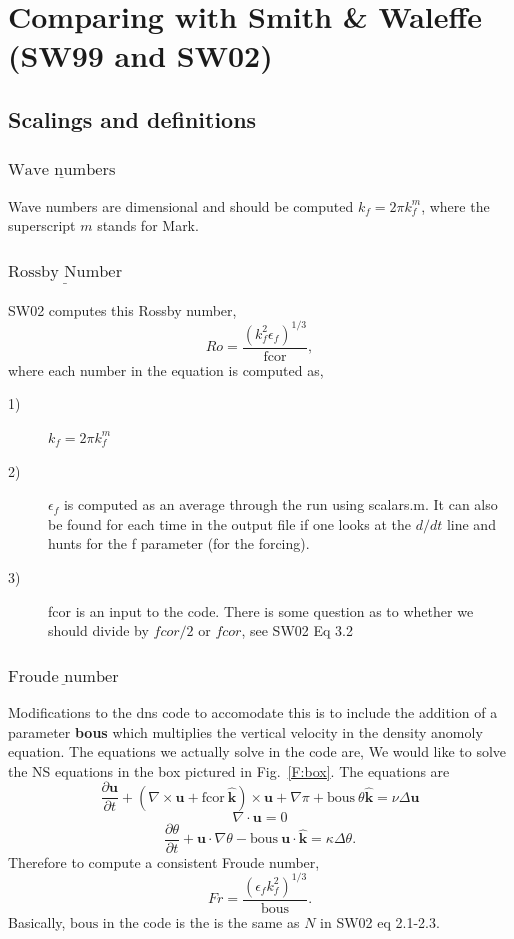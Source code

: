 \documentclass[12pt]{article}
\newcommand{\khat}{\hat{\mathbf k}}
\newcommand{\uv}{\mathbf u}
\newcommand{\grad}{\nabla}
\newcommand{\curl}{\grad \times}
\begin{document}
\noindent

\section{Comparing with Smith \& Waleffe (SW99 and SW02)}

\subsection{Scalings and definitions}

\subsubsection*{$\underline{\text{Wave numbers}}$}
Wave numbers are dimensional and should be computed $k_f = 2 \pi
k_f^m$, where the superscript $m$ stands for Mark. 

\subsubsection*{$\underline{\text{Rossby Number}}$}
SW02 computes this Rossby number,
\begin{equation}
  Ro = \frac{(k_f^2 \epsilon_f)^{1/3}}{\text{fcor}}, 
\end{equation}
where each number in the equation is computed as,
\begin{description}
   \item[1)] $k_f = 2 \pi k_f^m$
   \item[2)] $\epsilon_f$ is computed as an average through the run using
     scalars.m. It can also be found for each time in the output file
     if one looks at the $d/dt$ line and hunts for the f parameter (for
     the forcing).
  \item[3)] fcor is an input to the code. There is some question as to
    whether we should divide by $fcor/2$ or $fcor$, see SW02 Eq 3.2

\end{description}

\subsubsection*{$\underline{\text{Froude number}}$}

Modifications to the dns code to accomodate this is to include the
addition of a parameter {\bf{bous}} which multiplies the vertical
velocity in the  density anomoly equation. The equations we actually
solve in the code are,
We would like to solve the NS equations in the box pictured in
Fig.~\ref{F:box}.  The equations are
\[ 
\frac{ \partial  \uv }{\partial t}  + (\curl \uv + \text{fcor} ~\khat) \times \uv
+  
\grad \pi + \text{bous}~ \theta \khat = \nu \Delta \uv 
\] 
\[ 
\grad \cdot \uv = 0 
\] 
\[ 
\frac{ \partial  \theta }{\partial t}  + \uv \cdot \grad \theta -  
\text{bous} ~\uv \cdot \khat = \kappa \Delta \theta.
\] 
Therefore to compute a consistent Froude number,
\begin{equation}
Fr = \frac{(\epsilon_f k_f^2)^{1/3}}{\text{bous}}.
\end{equation}
Basically, $\text{bous}$ in the code is the is the same as $N$ in SW02 eq
2.1-2.3.
\end{document}
